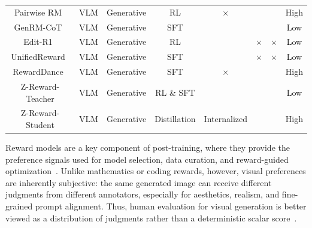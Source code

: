\documentclass{article}
\newcommand{\tabyes}{\ding{51}}
\newcommand{\tabno}{\ensuremath{\times}}
\newcommand{\mname}{Z-Reward\xspace}
\begin{document}
\begin{table}[H]
{\begin{tabular}{@{}c|c|c|c|c|c|c|c@{}}
  Pairwise RM~\cite{liu2025pairjudgermperformbestofn} & VLM & Generative & RL & \tabno & \tabyes & \tabyes & High \\
  GenRM-CoT~\cite{zhang2025generativeverifiersrewardmodeling} & VLM & Generative & SFT & \tabyes & \tabyes & \tabyes & Low \\
  Edit-R1~\cite{guo2026leveraging} & VLM & Generative & RL & \tabyes & \tabno & \tabno & Low \\
  UnifiedReward~\cite{wang2026unifiedrewardmodelmultimodal} & VLM & Generative & SFT & \tabyes & \tabno & \tabno & Low \\
  RewardDance~\cite{wu2025rewarddancerewardscalingvisual} & VLM & Generative & SFT & \tabno & \tabyes & \tabyes & High \\\midrule
  \mname-Teacher & VLM & Generative & RL \& SFT & \tabyes & \tabyes & \tabyes & Low \\
  \mname-Student & VLM & Generative & Distillation & Internalized & \tabyes & \tabyes & High \\
  \bottomrule
  \end{tabular}%
  }
  \end{table}


Reward models are a key component of post-training, where they provide the preference signals used for model selection, data curation, and reward-guided optimization~\cite{Ouyang2022TrainingLM, Christiano2017DeepRL, xu2023imagereward, xu2026visionrewardfinegrainedmultidimensionalhuman, wu2025rewarddancerewardscalingvisual}. Unlike mathematics or coding rewards, however, visual preferences are inherently subjective: the same generated image can receive different judgments from different annotators, especially for aesthetics, realism, and fine-grained prompt alignment. Thus, human evaluation for visual generation is better viewed as a distribution of judgments rather than a deterministic scalar score~\cite{murray2012ava,talebi2018nima,wu2023qalign, you2025teachinglargelanguagemodels, ma2025hpsv3widespectrumhumanpreference,uma2021learning,davani2022dealing}.
\end{document}
